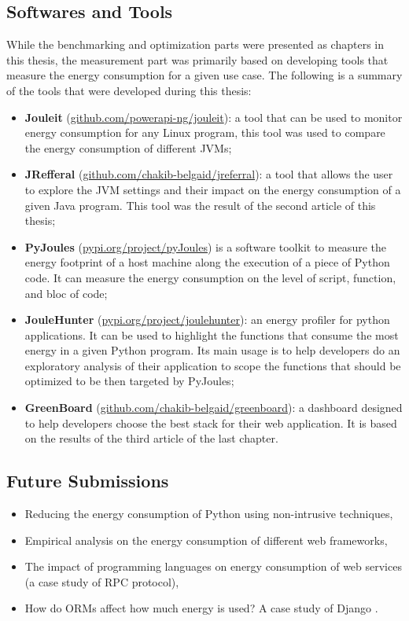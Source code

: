 \begin{enumerate}
\end{enumerate}

\subsection{Softwares and Tools}
While the benchmarking and optimization parts were presented as chapters in this thesis, the measurement part was primarily based on developing tools that measure the energy consumption for a given use case.
The following is a summary of the tools that were developed during this thesis:
\begin{itemize}
      \item \textbf{Jouleit} (\url{github.com/powerapi-ng/jouleit}): a tool that can be used to monitor energy consumption for any Linux program, this tool was used to compare the energy consumption of different JVMs;
      \item \textbf{JRefferal} (\url{github.com/chakib-belgaid/jreferral}): a tool that allows the user to explore the JVM settings and their impact on the energy consumption of a given Java program. This tool was the result of the second article of this thesis;
      \item \textbf{PyJoules} (\url{pypi.org/project/pyJoules}) is a software toolkit to measure the energy footprint of a host machine along the execution of a piece of Python code. It can measure the energy consumption on the level of script, function, and bloc of code;
      \item \textbf{JouleHunter} (\url{pypi.org/project/joulehunter}): an energy profiler for python applications. It can be used to highlight the functions that consume the most energy in a given Python program. Its main usage is to help developers do an exploratory analysis of their application to scope the functions that should be optimized to be then targeted by PyJoules;
      \item \textbf{GreenBoard} (\url{github.com/chakib-belgaid/greenboard}): a dashboard designed to help developers choose the best stack for their web application. It is based on the results of the third article of the last chapter.
\end{itemize}



\subsection{Future Submissions}
\begin{itemize}
      \item Reducing the energy consumption of Python using non-intrusive techniques,
      \item Empirical analysis on the energy consumption of different web frameworks,
      \item The impact of programming languages on energy consumption of web services (a case study of RPC protocol),
      \item How do ORMs affect how much energy is used? A case study of Django .
\end{itemize}

